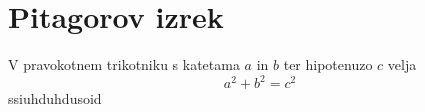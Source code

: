 \documentclass{article}
\begin{document}
\section*{Pitagorov izrek}
V pravokotnem trikotniku s katetama \(a\) in \(b\) ter hipotenuzo \(c\) velja
\[ a^2 + b^2 = c^2 \]
ssiuhduhdusoid
\end{document}
